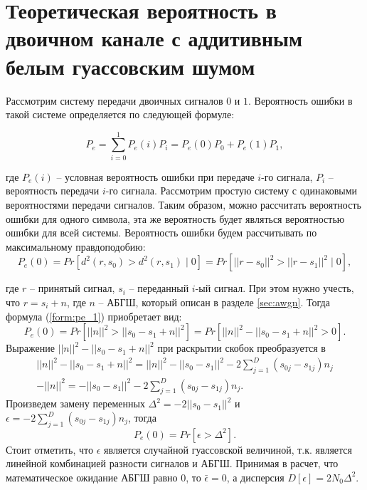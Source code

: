 \section{Теоретическая вероятность в двоичном канале с аддитивным белым гуассовским шумом}

Рассмотрим систему передачи двоичных сигналов $0$ и $1$. Вероятность ошибки в такой системе определяется по следующей формуле:

\begin{equation}
	P_e = \sum_{i=0}^{1}P_e(i)P_i = P_e(0)P_0 + P_e(1)P_1,
\end{equation}

где $P_e(i)$ -- условная вероятность ошибки при передаче $i$-го сигнала, $P_i$ -- вероятность передачи $i$-го сигнала. Рассмотрим простую систему с одинаковыми вероятностями передачи сигналов. Таким образом, можно рассчитать вероятность ошибки для одного символа, эта же вероятность будет являться вероятностью ошибки для всей системы. Вероятность ошибки будем рассчитывать по максимальному правдоподобию:
\begin{equation}
	\label{form:pe_1}
	P_e(0) = Pr[d^2(r,s_0) > d^2(r,s_1) \mid 0] = Pr[ || r - s_0||^2 > ||r - s_1||^2 \mid 0] ,
\end{equation}

где $r$ -- принятый сигнал, $s_i$ -- переданный $i$-ый сигнал. При этом нужно учесть, что $r = s_i + n$, где $n$ -- АБГШ, который описан в разделе \ref{sec:awgn}. Тогда формула (\ref{form:pe_1}) приобретает вид:
\begin{equation}
	P_e(0) = Pr[||n||^2 > ||s_0 - s_1 + n||^2] = Pr[||n||^2 - ||s_0 - s_1 + n||^2 > 0].
\end{equation}
Выражение $||n||^2 - ||s_0 - s_1 + n||^2$ при раскрытии скобок преобразуется в 
\begin{equation}
\begin{split}
	||n||^2 - ||s_0 - s_1 + n||^2 = ||n||^2 - ||s_0 - s_1||^2 - 2\sum_{j=1}^{D}(s_{0j} - s_{1j}) n_j\\ - ||n||^2 = 
	 - ||s_0 - s_1||^2 - 2\sum_{j=1}^{D}(s_{0j} - s_{1j}) n_j.
\end{split}
\end{equation}
Произведем замену переменных $\Delta^2 =-2||s_0 - s_1||^2$ и $\epsilon =  -2\sum_{j=1}^{D}(s_{0j} - s_{1j}) n_j$, тогда 
\begin{equation}
	P_e(0) = Pr[\epsilon > \Delta^2].
\end{equation}
Стоит отметить, что $\epsilon$ является случайной гуассовской величиной, т.к. является линейной комбинацией разности сигналов и АБГШ. Принимая в расчет, что математическое ожидание АБГШ равно $0$, то $\bar{\epsilon} = 0$, а дисперсия $D[\epsilon] = 2N_0\Delta^2$.

